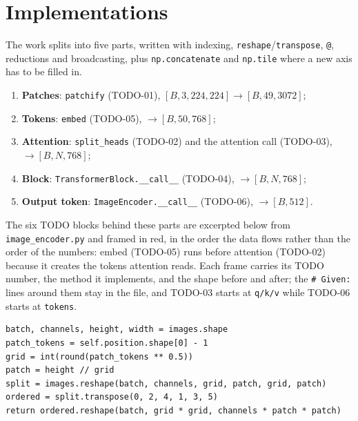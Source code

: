 \documentclass[a4paper,12pt]{article}
\begin{document}
\section{Implementations}

The work splits into five parts, written with indexing,
\texttt{reshape}/\texttt{transpose}, \texttt{@}, reductions and broadcasting,
plus \texttt{np.concatenate} and \texttt{np.tile} where a new axis has to be
filled in.

\begin{enumerate}[itemsep=2pt,topsep=3pt,parsep=0pt,leftmargin=2.4em]
    \item[Part 1] \textbf{Patches}: \texttt{patchify} (TODO-01),
    $[B,3,224,224]\rightarrow[B,49,3072]$;
    \item[Part 2] \textbf{Tokens}: \texttt{embed} (TODO-05),
    $\rightarrow[B,50,768]$;
    \item[Part 3] \textbf{Attention}: \texttt{split\_heads} (TODO-02) and
    the attention call (TODO-03), $\rightarrow[B,N,768]$;
    \item[Part 4] \textbf{Block}: \texttt{TransformerBlock.\_\_call\_\_}
    (TODO-04), $\rightarrow[B,N,768]$;
    \item[Part 5] \textbf{Output token}:
    \texttt{ImageEncoder.\_\_call\_\_} (TODO-06), $\rightarrow[B,512]$.
\end{enumerate}

The six TODO blocks behind these parts are excerpted below from
\texttt{image\_encoder.py} and framed in red, in the order the data flows rather
than the order of the numbers: embed (TODO-05) runs before attention (TODO-02)
because it creates the tokens attention reads. Each frame carries its TODO
number, the method it implements, and the shape before and after; the
\texttt{\# Given:} lines around them stay in the file, and TODO-03 starts at
\texttt{q/k/v} while TODO-06 starts at \texttt{tokens}.

\begin{lstlisting}[title={\color{studentred}\small \textbf{TODO-01}\;\textemdash\;\texttt{patchify}\enspace $[B,3,224,224]\rightarrow[B,49,3072]$}]
batch, channels, height, width = images.shape
patch_tokens = self.position.shape[0] - 1
grid = int(round(patch_tokens ** 0.5))
patch = height // grid
split = images.reshape(batch, channels, grid, patch, grid, patch)
ordered = split.transpose(0, 2, 4, 1, 3, 5)
return ordered.reshape(batch, grid * grid, channels * patch * patch)
\end{lstlisting}
\end{document}
